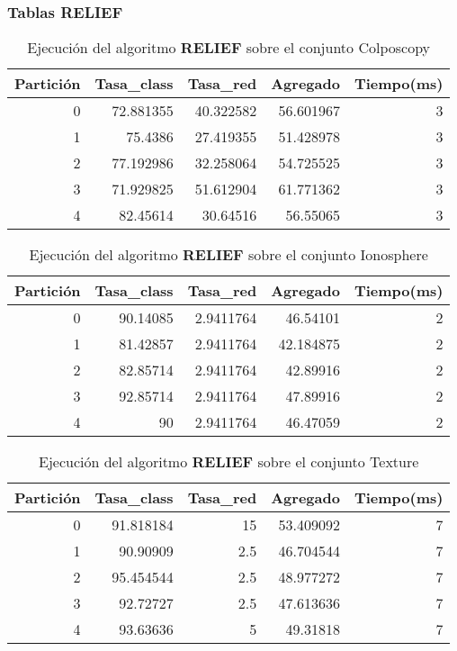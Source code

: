 \documentclass[size=a4, parskip=half, titlepage=false, toc=flat, toc=bib, 12pt]{scrartcl}
\begin{document}
\newpage
\subsubsection{Tablas RELIEF}

 \begin{table}[ht]
  \centering
  \begin{tabular}[t]{rrrrr}
  \toprule
  Partición &Tasa\_class &Tasa\_red & Agregado & Tiempo(ms)\\
  \midrule
0         & 72.881355 & 40.322582 & 56.601967 & 3      \\
1         & 75.4386   & 27.419355 & 51.428978 & 3      \\
2         & 77.192986 & 32.258064 & 54.725525 & 3      \\
3         & 71.929825 & 51.612904 & 61.771362 & 3      \\
4         & 82.45614  & 30.64516  & 56.55065  & 3      \\
  \bottomrule
  \end{tabular}
  \caption{Ejecución del algoritmo \textbf{RELIEF} sobre el conjunto Colposcopy }
  \end{table}%

 \begin{table}[ht]
  \centering
  \begin{tabular}[t]{rrrrr}
  \toprule
  Partición &Tasa\_class &Tasa\_red & Agregado & Tiempo(ms)\\
  \midrule
0         & 90.14085  & 2.9411764 & 46.54101  & 2      \\
1         & 81.42857  & 2.9411764 & 42.184875 & 2      \\
2         & 82.85714  & 2.9411764 & 42.89916  & 2      \\
3         & 92.85714  & 2.9411764 & 47.89916  & 2      \\
4         & 90        & 2.9411764 & 46.47059  & 2      \\
  \bottomrule
  \end{tabular}
  \caption{Ejecución del algoritmo \textbf{RELIEF} sobre el conjunto Ionosphere}
  \end{table}%

 \begin{table}[ht]
  \centering
  \begin{tabular}[t]{rrrrr}
  \toprule
  Partición &Tasa\_class &Tasa\_red & Agregado & Tiempo(ms)\\
  \midrule
0         & 91.818184 & 15       & 53.409092 & 7      \\
1         & 90.90909  & 2.5      & 46.704544 & 7      \\
2         & 95.454544 & 2.5      & 48.977272 & 7      \\
3         & 92.72727  & 2.5      & 47.613636 & 7      \\
4         & 93.63636  & 5        & 49.31818  & 7      \\
  \bottomrule
  \end{tabular}
  \caption{Ejecución del algoritmo \textbf{RELIEF} sobre el conjunto Texture}

  \end{table}%
\end{document}
